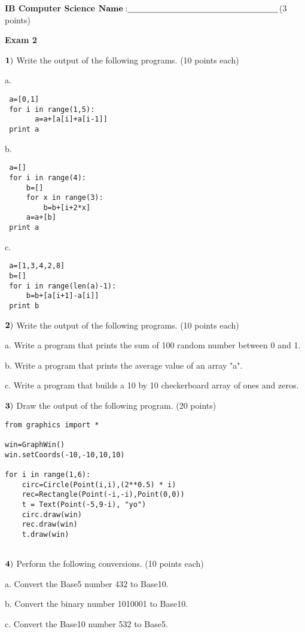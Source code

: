 \documentclass{article}
\begin{document}

\doublespacing
\textbf{IB Computer Science }                        %
 \hfill                             %
$ {\bf Name: } \underline{\hspace{2.5in}}$(3 points)

\begin{centering}
\vspace{1cm}
\textbf{Exam 2}\\
\end{centering}
\vspace{1cm}
 

  
 $\bf{1)}$ Write the output of the following programs. (10 points each)
 
 \vspace{1cm}

  
 a.   \begin{verbatim}
 a=[0,1]
 for i in range(1,5):
       a=a+[a[i]+a[i-1]]
 print a
 \end{verbatim}
 \vspace{1cm}
 
 b.  \begin{verbatim}
 a=[]
 for i in range(4):
     b=[]
     for x in range(3):
         b=b+[i+2*x]
     a=a+[b]
 print a
 \end{verbatim}
 \vspace{1cm}
 
 c.  \begin{verbatim}
 a=[1,3,4,2,8]
 b=[]
 for i in range(len(a)-1):
     b=b+[a[i+1]-a[i]]
 print b
 \end{verbatim}
 
  \newpage
  
  $\bf{2)}$ Write the output of the following programs. (10 points each)
  
  a.  Write a program that prints the sum of 100 random number between 0 and 1. 
  
  b.  Write a program that prints the average value of an array "a". 
  
  c.  Write a program that builds a 10 by 10 checkerboard array of ones and zeros.

  
  
  
    \newpage
  
  $\bf{3)}$  Draw the output of the following program. (20 points)
  \begin{verbatim}
from graphics import *

win=GraphWin()
win.setCoords(-10,-10,10,10)

for i in range(1,6):
    circ=Circle(Point(i,i),(2**0.5) * i)
    rec=Rectangle(Point(-i,-i),Point(0,0))
    t = Text(Point(-5,9-i), "yo")
    circ.draw(win)
    rec.draw(win)
    t.draw(win)
    
    \end{verbatim}
    
   
  \newpage
  
  $\bf{4)}$ Perform the following conversions. (10 points each)
  \vspace{0.5cm}
  
   a. Convert the Base5 number 432 to Base10. 
  
  b. Convert the binary number 1010001 to Base10. 
  
  c. Convert the Base10 number 532 to Base5.
  
  

 
\end{document}

